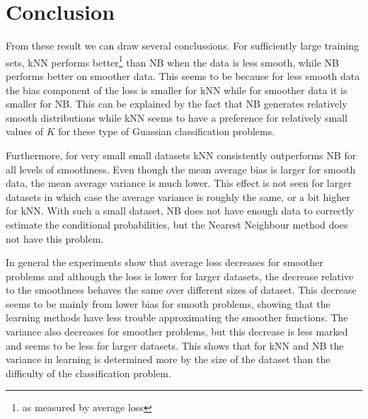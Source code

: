 \documentclass[a4paper]{article}
\begin{document}
\section{Conclusion}


From these result we can draw several conclussions. For sufficiently large training sets, \ac{kNN} performs better\footnote{as measured by average loss} than \ac{NB} when the data is less smooth, while \ac{NB} performs better on smoother data. This seems to be because for less smooth data the bias component of the loss is smaller for \ac{kNN} while for smoother data it is smaller for \ac{NB}. This can be explained by the fact that \ac{NB} generates relatively smooth distributions while \ac{kNN} seems to have a preference for relatively small values of $K$ for these type of Guassian classification problems.

Furthermore, for very small small datasets \ac{kNN} consistently outperforms \ac{NB} for all levels of smoothness. Even though the mean average bias is larger for smooth data, the mean average variance is much lower. This effect is not seen for larger datasets in which case the average variance is roughly the same, or a bit higher for \ac{kNN}. With such a small dataset, \ac{NB} does not have enough data to correctly estimate the conditional probabilities, but the Nearest Neighbour method does not have this problem.

In general the experiments show that average loss decreases for smoother problems and although the loss is lower for larger datasets, the decrease relative to the smoothness behaves the same over different sizes of dataset. This decrease seems to be mainly from lower bias for smooth problems, showing that the learning methods have less trouble approximating the smoother functions. The variance also decreases for smoother problems, but this decrease is less marked and seems to be less for larger datasets. This shows that for \ac{kNN} and \ac{NB} the variance in learning is determined more by the size of the dataset than the difficulty of the classification problem.



\end{document}
